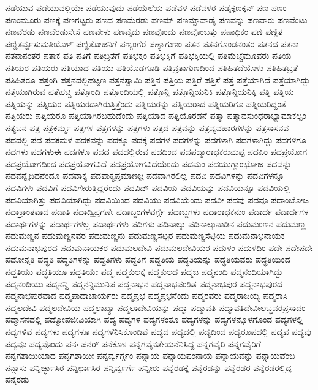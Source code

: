 {ಪಡೆಯುವ
ಪಡೆಯುವಲ್ಲಿಯೇ
ಪಡೆಯುವುದು
ಪಡೆಯೆಲೆಯ
ಪಡೆವಳ
ಪಡೆವಳರ
ಪಡೈಕ್ಕಣಕ್ಕನ್
ಪಣ
ಪಣಂ
ಪಣಂಮೂರು
ಪಣಕ್ಕೆ
ಪಣಗಟ್ಟರು
ಪಣದ
ಪಣಮೆರಡು
ಪಣಮ್
ಪಣಮ್ಪಾವಾಡೈ
ಪಣವನ್ನು
ಪಣವಾರು
ಪಣವೆಂಟು
ಪಣವೆರಡು
ಪಣವೆರಡುಸೇಸೆ
ಪಣವೇಳು
ಪಣವೈದು
ಪಣವೊಂದು
ಪಣವೊಂಬತ್ತು
ಪಣಾಧಿಕಂ
ಪಣಿ
ಪಣ್ಡಿತ
ಪಣ್ಡಿತರ್ವ್ವಸುಮತಿಯೊಳ್
ಪಣ್ಡಿತೋಜನಿಗೆ
ಪಣ್ಯಂಗೆರೆ
ಪಣ್ಯಾಗುಣಂ
ಪತನ
ಪತನಗೊಂಡನಂತರ
ಪತನದ
ಪತನಾ
ಪತನಾನಂತರ
ಪತಾಕ
ಪತಿ
ಪತಿಗೆ
ಪತಿಬ್ರತೆಗೆ
ಪತಿಭಕ್ತಂ
ಪತಿಭಕ್ತಿಗೆ
ಪತಿಭಕ್ತಿಯಲ್ಲಿ
ಪತಿಮೆಚ್ಚೆಮೂವರು
ಪತಿಯ
ಪತಿಯರ
ಪತಿಯರು
ಪತಿಯಾದ
ಪತಿಯು
ಪತಿಯೊಡಗೂಡಿ
ಪತಿವ್ರತಾಗುಣದಿಂದ
ಪತಿಹಿತದೆಯೊಳು
ಪತಿಹಿತಬ್ರತೆ
ಪತಿಹಿತರೂ
ಪತ್ತಂಗಿ
ಪತ್ತನದಲ್ಲಿಹಟ್ಟಣ
ಪತ್ತನಸ್ವಾಮಿ
ಪತ್ತಿನ
ಪತ್ತಿಯ
ಪತ್ತಿರೆ
ಪತ್ತಿಸೆ
ಪತ್ತೆ
ಪತ್ತೆಯಾಗಿದೆ
ಪತ್ತೆಯಾಗಿದ್ದು
ಪತ್ತೆಯಾಗಿರುವ
ಪತ್ತೆಹಚ್ಚಿ
ಪತ್ತೊಂದಿ
ಪತ್ತೊಂದಿಯಲ್ಲಿ
ಪತ್ತೊನ್ದಿ
ಪತ್ತೊನ್ದಿಯನಿಕಿ
ಪತ್ತೊನ್ದಿಯನಿಕ್ಕಿ
ಪತ್ನಿ
ಪತ್ನಿಯ
ಪತ್ನಿಯನ್ನು
ಪತ್ನಿಯರ
ಪತ್ನಿಯರದಾಗಿರುತ್ತಿತ್ತೆಂದು
ಪತ್ನಿಯರನ್ನು
ಪತ್ನಿಯರಾದ
ಪತ್ನಿಯರಿಗೂ
ಪತ್ನಿಯರಿದ್ದಂತೆ
ಪತ್ನಿಯರು
ಪತ್ನಿಯರೂ
ಪತ್ನಿಯಾಗಿರಬಹುದೆಂದು
ಪತ್ನಿಯಾದ
ಪತ್ನಿಯೊರಡನೆ
ಪತ್ಮಾ
ಪತ್ಮಾವಸುಂಧರಾಭ್ಯಾಮಾಕಲ್ಪಂ
ಪತ್ಯಬನ
ಪತ್ರ
ಪತ್ರಕರ್ಮ್ಮ
ಪತ್ರಗಳ
ಪತ್ರಗಳನ್ನು
ಪತ್ರಗಳು
ಪತ್ರದ
ಪತ್ರವನ್ನು
ಪತ್ರವ್ಯವಹಾರಗಳನ್ನು
ಪತ್ರಸಾಸನವ
ಪಥದಲ್ಲಿ
ಪದ
ಪದಕಮಳ
ಪದಕವನ್ನು
ಪದಕ್ಕೂ
ಪದಕ್ಕೆ
ಪದಗಳ
ಪದಗಳನ್ನು
ಪದಗಳಾಗಿ
ಪದಗಳಾಗಿದ್ದು
ಪದಗಳಿಗೂ
ಪದಗಳು
ಪದಗಳುಈ
ಪದಗಳೂ
ಪದದ
ಪದದಲ್ಲಿರುವ
ಪದದಿಂದ
ಪದಪದ್ಮಾರಾಧಕರುಮಪ್ಪ
ಪದಪಿಂ
ಪದಪ್ರಯೋಗ
ಪದಪ್ರಯೋಗದಿಂದ
ಪದಪ್ರಯೋಗವಿದೆ
ಪದಪ್ರಯೋಗವಿದೆಯೆಂದು
ಪದಮಂ
ಪದಯುಗ್ಮಾಂಭೋಜ
ಪದವನ್ನು
ಪದವನ್ನೈದಿದನೆಂದೂ
ಪದವಾಕ್ಯ
ಪದವಾಕ್ಯಪ್ರಮಾಣಜ್ಞ
ಪದವಾಗಿರಲಿಲ್ಲ
ಪದವಿ
ಪದವಿಗಳನ್ನು
ಪದವಿಗಳನ್ನೂ
ಪದವಿಗಳು
ಪದವಿಗೆ
ಪದವಿಗೇರುತ್ತಿದ್ದರೆಂದು
ಪದವಿದೌ
ಪದವಿಯ
ಪದವಿಯನ್ನು
ಪದವಿಯನ್ನೂ
ಪದವಿಯಲ್ಲಿ
ಪದವಿಯಾಗಿತ್ತು
ಪದವಿಯಾಗಿದ್ದು
ಪದವಿಯಿಂದ
ಪದವಿಯು
ಪದವಿಯೆಂದು
ಪದವೀ
ಪದವು
ಪದವೂ
ಪದಾಂಬೋಜ
ಪದಾಕ್ರಾಂತವಾದ
ಪದಾತಿ
ಪದಾದ್ವಿಪ್ರಗಣೇ
ಪದಾಬ್ಜಂಗಳವರ್ಗ್ಗೆ
ಪದಾಬ್ಜಗಳು
ಪದಾರಾಧಕನುಂ
ಪದಾರ್ಥ
ಪದಾರ್ಥಗಳ
ಪದಾರ್ಥಗಳನ್ನು
ಪದಾರ್ಥಗಳಲ್ಲ
ಪದಾರ್ಥಗಳು
ಪದಿಗಳು
ಪದಿನಾಲ್ಕು
ಪದಿನಾಲ್ಕುನಾಡಿನ
ಪದುಮಂಣನ
ಪದುಮಣ್ಣ
ಪದುಮಣ್ಣನ
ಪದುಮಣ್ಣನವರ
ಪದುಮಣ್ಣನು
ಪದುಮಣ್ಣಸೆಟ್ಟರ
ಪದುಮಣ್ಣಸೆಟ್ಟಿಯ
ಪದುಮನಾಭನಾಯಕ
ಪದುಮನಾಭಪುರದ
ಪದುಮನಾಯಕರ
ಪದುಮಲದೇವಿ
ಪದುಮಲದೇವಿಯರ
ಪದುಳಂ
ಪದುಳದಿಂ
ಪದೇ
ಪದೇಪದೇ
ಪದೋನ್ನತಿ
ಪದ್ಧತಿ
ಪದ್ಧತಿಗಳನ್ನು
ಪದ್ಧತಿಗಳು
ಪದ್ಧತಿಗೆ
ಪದ್ಧತಿಯ
ಪದ್ಧತಿಯನ್ನು
ಪದ್ಧತಿಯವರು
ಪದ್ಧತಿಯಿಂದ
ಪದ್ಧತಿಯು
ಪದ್ಧತಿಯೂ
ಪದ್ಧತಿಯೇ
ಪದ್ಮ
ಪದ್ಮಕುಲಕ್ಕೆ
ಪದ್ಮಕುಲದ
ಪದ್ಮಜ
ಪದ್ಮನಂದಿ
ಪದ್ಮನಂದಿಯಾಗಿದ್ದು
ಪದ್ಮನಂದಿಯು
ಪದ್ಮನನ್ದಿ
ಪದ್ಮನನ್ದಿಮುನಿಪ
ಪದ್ಮನಾಭನ
ಪದ್ಮನಾಭಪಂಡಿತ
ಪದ್ಮನಾಭಪುರ
ಪದ್ಮನಾಭಪುರದ
ಪದ್ಮನಾಭಪುರವಾದ
ಪದ್ಮಪಾದಾಚಾರ್ಯರು
ಪದ್ಮಪ್ರಭ
ಪದ್ಮಪ್ರಭನೆಂದು
ಪದ್ಮರವರು
ಪದ್ಮರಾಜಯ್ಯ
ಪದ್ಮರಾಸಿ
ಪದ್ಮಲದೇವಿ
ಪದ್ಮಲದೇವಿಯ
ಪದ್ಮಲಾಖ್ಯಾ
ಪದ್ಮಲಾದೇವಿಯನ್ನು
ಪದ್ಮಾ
ಪದ್ಮಾವತಿ
ಪದ್ಮಾವತಿದೇವೀಲಬ್ಧವರಪ್ರಸಾದಂ
ಪದ್ಮಾಸನದಲ್ಲಿ
ಪದ್ಮೋಪಜೀವಿಯಾಗಿ
ಪದ್ಯ
ಪದ್ಯಗಳ
ಪದ್ಯಗಳಂತೂ
ಪದ್ಯಗಳನ್ನು
ಪದ್ಯಗಳನ್ನೊಳಗೊಂಡ
ಪದ್ಯಗಳಲ್ಲಿ
ಪದ್ಯಗಳಿವೆ
ಪದ್ಯಗಳು
ಪದ್ಯಗಳೂ
ಪದ್ಯಗಳೆನಿಸಿಕೊಂಡಿವೆ
ಪದ್ಯದ
ಪದ್ಯದಲ್ಲಿ
ಪದ್ಯದಿಂದ
ಪದ್ಯರೂಪದಲ್ಲಿ
ಪದ್ಯವ
ಪದ್ಯವು
ಪದ್ಯವೂ
ಪದ್ಯವೊಂದು
ಪನಃ
ಪನರ್
ಪನೆಕೊಳ
ಪನ್ನಗವೈನತೇಯನೆನಿಸಿದ್ದ
ಪನ್ನಗವೈರಿ
ಪನ್ನಗವೈರಿಗೆ
ಪನ್ನಗಶಾಯಿಯಾದ
ಪನ್ನಗಶಾಯೀ
ಪನ್ನರ್ವ್ವರ್ಗ್ಗಂ
ಪನ್ನಾಯ
ಪನ್ನಾಯಪಂನಾಯ
ಪನ್ನಾಯವನ್ನು
ಪನ್ನಾಯವೆಂಬ
ಪನ್ನಾಸು
ಪನ್ನಿರ್ಚ್ಛಾಸಿರ
ಪನ್ನಿರ್ಛಾಸಿರ
ಪನ್ನಿರ್ವ್ವರ್ಗೆ
ಪನ್ನೀರು
ಪನ್ನೆರಡಕ್ಕೆ
ಪನ್ನೆರಡನ್ನು
ಪನ್ನೆರಡರ
ಪನ್ನೆರಡರಲ್ಲಿದ್ದ
ಪನ್ನೆರಡು
}

